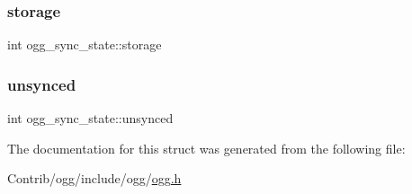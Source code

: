 \subsubsection{\texorpdfstring{storage}{storage}}
{\footnotesize\ttfamily int ogg\+\_\+sync\+\_\+state\+::storage}

\mbox{\label{structogg__sync__state_a8d538bb32400470f00080e2160158a76}} 
\subsubsection{\texorpdfstring{unsynced}{unsynced}}
{\footnotesize\ttfamily int ogg\+\_\+sync\+\_\+state\+::unsynced}



The documentation for this struct was generated from the following file\+:\begin{DoxyCompactItemize}
\item 
Contrib/ogg/include/ogg/\mbox{\hyperlink{ogg_8h}{ogg.\+h}}\end{DoxyCompactItemize}
